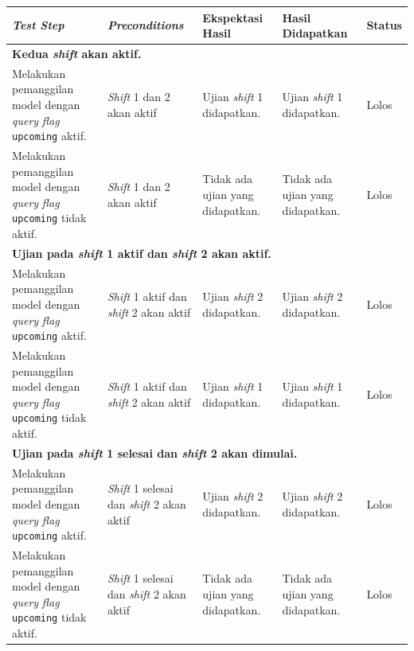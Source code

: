 \begin{enumerate}
        \begin{tabularx}{0.9\textwidth}{|X|X|X|X|X|}
            \hline
            \textit{Test Step} & \textit{Preconditions} & Ekspektasi Hasil & Hasil Didapatkan & Status  \\
            \hline
            \multicolumn{5}{|p{0.8\textwidth}|}{\textbf{Kedua \textit{shift} akan aktif.}}\\
            \hline
            Melakukan pemanggilan model dengan \textit{query} \textit{flag} \texttt{upcoming} aktif. &
            \textit{Shift} 1 dan 2 akan aktif & Ujian \textit{shift} 1 didapatkan. & Ujian \textit{shift} 1 didapatkan. & Lolos \\
            \hline
            Melakukan pemanggilan model dengan \textit{query} \textit{flag} \texttt{upcoming} tidak aktif. &
            \textit{Shift} 1 dan 2 akan aktif & Tidak ada ujian yang didapatkan. & Tidak ada ujian yang didapatkan. & Lolos \\
            \hline
            
            \multicolumn{5}{|p{0.8\textwidth}|}{\textbf{Ujian pada \textit{shift} 1 aktif dan \textit{shift} 2 akan aktif.}}\\
            \hline
            Melakukan pemanggilan model dengan \textit{query} \textit{flag} \texttt{upcoming} aktif. &
            \textit{Shift} 1 aktif dan \textit{shift} 2 akan aktif & Ujian \textit{shift} 2 didapatkan. & Ujian \textit{shift} 2 didapatkan. & Lolos \\
            \hline
            Melakukan pemanggilan model dengan \textit{query} \textit{flag} \texttt{upcoming} tidak aktif. &
            \textit{Shift} 1 aktif dan \textit{shift} 2 akan aktif & Ujian \textit{shift} 1 didapatkan. & Ujian \textit{shift} 1 didapatkan. & Lolos \\
            \hline
            
            \multicolumn{5}{|p{0.8\textwidth}|}{\textbf{Ujian pada \textit{shift} 1 selesai dan \textit{shift} 2 akan dimulai.}}\\
            \hline
            Melakukan pemanggilan model dengan \textit{query} \textit{flag} \texttt{upcoming} aktif. &
            \textit{Shift} 1 selesai dan \textit{shift} 2 akan aktif & Ujian \textit{shift} 2 didapatkan. & Ujian \textit{shift} 2 didapatkan. & Lolos \\
            \hline
            Melakukan pemanggilan model dengan \textit{query} \textit{flag} \texttt{upcoming} tidak aktif. &
            \textit{Shift} 1 selesai dan \textit{shift} 2 akan aktif & Tidak ada ujian yang didapatkan. & Tidak ada ujian yang didapatkan. & Lolos \\
            \hline
            

\end{tabularx}
\end{enumerate}
